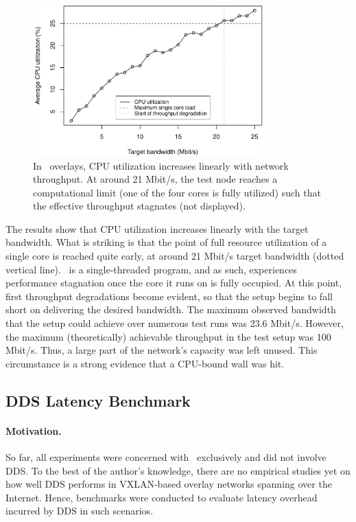 \begin{figure}[htpb]
  \centering
  \includegraphics[width=0.79\textwidth]{figures/cpu}
  \caption[\weave\ CPU utilization test results]{In \weave\ overlays, CPU utilization increases linearly with network throughput. At around 21 Mbit/s, the test node reaches a computational limit (one of the four cores is fully utilized) such that the effective throughput stagnates (not displayed).}\label{fig:cpu}
\end{figure}

The results show that CPU utilization increases linearly with the target bandwidth. What is striking is that the point of full resource utilization of a single core is reached quite early, at around 21 Mbit/s target bandwidth (dotted vertical line). \wnet\ is a single-threaded program, and as such, experiences performance stagnation once the core it runs on is fully occupied. At this point, first throughput degradations become evident, so that the setup begins to fall short on delivering the desired bandwidth. The maximum observed bandwidth that the setup could achieve over numerous test runs was 23.6 Mbit/s.
However, the maximum (theoretically) achievable throughput in the test setup was 100 Mbit/s. Thus, a large part of the network's capacity was left unused. This circumstance is a strong evidence that a CPU-bound wall was hit.
%
%
%
%
%
%
%
%
%
%

\subsection{DDS Latency Benchmark} \label{sec:ddslatency}

\paragraph{Motivation.} So far, all experiments were concerned with \wnet\ exclusively and did not involve DDS. To the best of the author's knowledge, there are no empirical studies yet on how well DDS performs in VXLAN-based overlay networks spanning over the Internet. Hence, benchmarks were conducted to evaluate latency overhead incurred by DDS in such scenarios.

